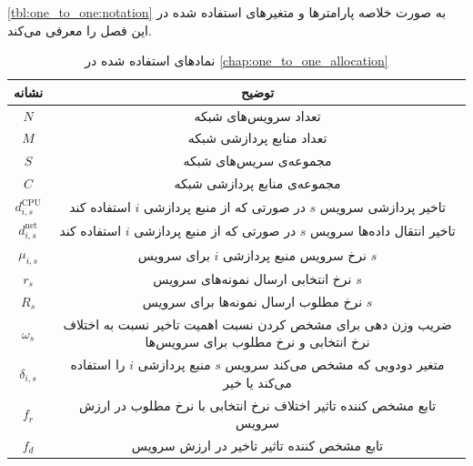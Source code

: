     \cref{tbl:one_to_one:notation} به صورت خلاصه پارامتر‌ها و متغیر‌های استفاده شده در این فصل را معرفی می‌کند.
    \begin{table}[h]
      \caption{نماد‌های استفاده شده در \cref{chap:one_to_one_allocation}}
      \begin{tabularx}{\textwidth}{|c|C|} \hline
        نشانه                & توضیح                                                                                     \\ \hline
        $N$                  & تعداد سرویس‌های شبکه                                                                       \\ \hline
        $M$                  & تعداد منابع پردازشی شبکه                                                                  \\ \hline
        $S$                  & مجموعه‌ی سریس‌های شبکه                                                                      \\ \hline
        $C$                  & مجموعه‌ی منابع پردازشی شبکه                                                                \\ \hline
        $d_{i,s}^\text{CPU}$ & تاخیر پردازشی سرویس $s$ در صورتی که از منبع پردازشی $i$ استفاده کند                       \\ \hline
        $d_{i,s}^\text{net}$ & تاخیر انتقال داده‌ها سرویس $s$  در صورتی که از منبع پردازشی $i$ استفاده کند                \\ \hline
        $\mu_{i,s}$         & نرخ سرویس منبع پردازشی $i$ برای سرویس $s$                                                  \\ \hline
        $r_s$               & نرخ انتخابی ارسال نمونه‌های سرویس $s$                                                       \\ \hline
        $R_s$               & نرخ مطلوب ارسال نمونه‌ها برای سرویس $s$                                                     \\ \hline
        $\omega_s$          & ضریب وزن دهی برای مشخص کردن نسبت اهمیت تاخیر نسبت به اختلاف نرخ انتخابی و نرخ مطلوب برای سرویس‌ها \\ \hline
        $\delta_{i,s}$      & متغیر دودویی که مشخص می‌کند سرویس $s$ منبع پردازشی $i$ را استفاده می‌کند یا خیر              \\ \hline
        $f_r$               & تابع مشخص کننده تاثیر اختلاف نرخ انتخابی با نرخ مطلوب در ارزش سرویس                         \\ \hline
        $f_d$               & تابع مشخص کننده تاثیر تاخیر در ارزش سرویس                                                  \\ \hline

\end{tabularx}
\end{table}
